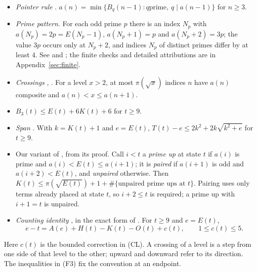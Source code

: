\documentclass[11pt]{article}
\theoremstyle{definition}
\theoremstyle{remark}
\begin{document}
\begin{itemize}
\item[(F1)] \emph{Pointer rule} \cite[eq.~(2)]{lrs}. $a(n)=\min\{B_q(n-1):q\text{
  prime},\ q\mid a(n-1)\}$ for $n\ge3$.
\item[(F2)] \emph{Prime pattern.}
  For each odd prime $p$ there is an index $N_p$ with $a(N_p)=2p=E(N_p-1)$,
  $a(N_p+1)=p$ and $a(N_p+2)=3p$; the value $3p$ occurs only at $N_p+2$,
  and indices $N_p$ of distinct primes differ by at least $4$.
  See \cite[Theorem~4.3]{hp} and \cite[(F2)]{haver}; the finite checks and
  detailed attributions are in Appendix~\ref{sec:finite}.
\item[(F3)] \emph{Crossings} \cite[Lemma~4.5]{hp}, \cite{haver}. For a
  level $x>2$, at most $\pi(\sqrt x)$ indices $n$ have $a(n)$ composite and
  $a(n)<x\le a(n+1)$.
\item[(L7)] \cite[Lemma~7]{haver} $B_3(t)\le E(t)+6K(t)+6$ for $t\ge9$.
\item[(SP)] \emph{Span} \cite[Theorem~8]{haver}. With $k=K(t)+1$ and
  $e=E(t)$, $T(t)-e\le 2k^2+2k\sqrt{k^2+e}$ for $t\ge9$.
\item[(EE)] Our variant of \cite[Lemma~4]{haver}, from its proof. Call $i<t$ a \emph{prime up} at state
  $t$ if $a(i)$ is prime and $a(i)<E(t)\le a(i+1)$; it is \emph{paired} if
  $a(i+1)$ is odd and $a(i+2)<E(t)$, and \emph{unpaired} otherwise. Then
  $K(t)\le\pi(\sqrt{E(t)})+1+\#\{\text{unpaired prime ups at }t\}$.
  Pairing uses only terms already placed at state $t$, so $i+2\le t$ is
  required; a prime up with $i+1=t$ is unpaired.
\item[(CL)] \emph{Counting identity} \cite[Corollary~12(b)]{haver}, in the exact form of
  \cite{graham}. For $t\ge9$ and $e=E(t)$,
  \[ e-t=A(e)+H(t)-K(t)-O(t)+c(t),\qquad 1\le c(t)\le5 .\]
\end{itemize}

Here $c(t)$ is the bounded correction in (CL). A crossing of a level
is a step from one side of that level to the other; upward and downward
refer to its direction. The inequalities in (F3) fix the convention at
an endpoint.
\end{document}
